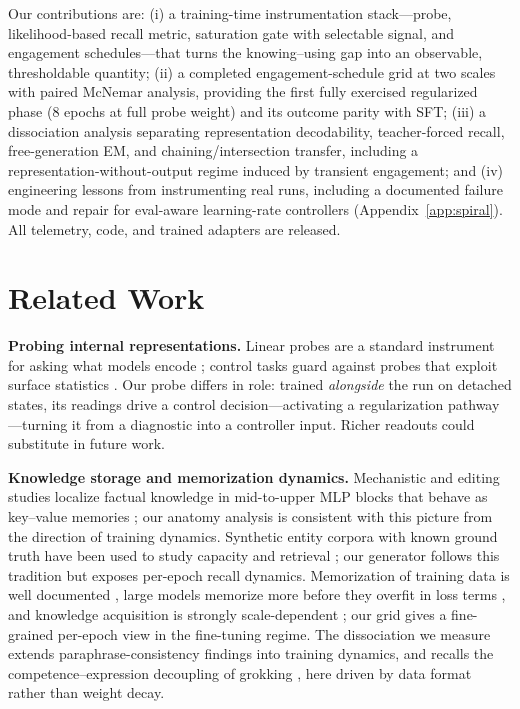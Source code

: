 Our contributions are: (i) a training-time instrumentation stack---probe,
likelihood-based recall metric, saturation gate with selectable signal,
and engagement schedules---that turns the knowing--using gap into an
observable, thresholdable quantity; (ii) a completed
engagement-schedule grid at two scales with paired McNemar analysis,
providing the first fully exercised regularized phase (8 epochs at
full probe weight) and its outcome parity with SFT; (iii) a
dissociation analysis separating representation decodability,
teacher-forced recall, free-generation EM, and chaining/intersection
transfer, including a representation-without-output regime induced by
transient engagement; and (iv) engineering lessons from instrumenting
real runs, including a documented failure mode and repair for
eval-aware learning-rate controllers (Appendix~\ref{app:spiral}).
All telemetry, code, and trained adapters are released.

\section{Related Work}
\label{sec:related}

\textbf{Probing internal representations.} Linear probes are a standard
instrument for asking what models encode
\citep{alain2017probes,belinkov2022probing}; control tasks guard against
probes that exploit surface statistics \citep{hewitt2019control}. Our
probe differs in role: trained \emph{alongside} the run on detached
states, its readings drive a control decision---activating a
regularization pathway---turning it from a diagnostic into a controller
input. Richer readouts \citep{bricken2023monosemanticity} could
substitute in future work.

\textbf{Knowledge storage and memorization dynamics.} Mechanistic and
editing studies localize factual knowledge in mid-to-upper MLP blocks
that behave as key--value memories
\citep{meng2022rome,meng2023memit,geva2021ffn,dai2022knowledgeneurons,
mitchell2022mend}; our anatomy analysis is consistent with this picture
from the direction of training dynamics. Synthetic entity corpora with
known ground truth have been used to study capacity and retrieval
\citep{allen2023physics}; our generator follows this tradition but
exposes per-epoch recall dynamics. Memorization of training data is
well documented \citep{carlini2023quantifying,zhang2017understanding},
large models memorize more before they overfit in loss terms
\citep{tirumala2022memorization}, and knowledge acquisition is strongly
scale-dependent \citep{kaplan2020scaling,kandpal2023large}; our grid
gives a fine-grained per-epoch view in the fine-tuning regime. The
dissociation we measure extends paraphrase-consistency findings
\citep{elazar2021measuring,mallen2023pararel} into training dynamics,
and recalls the competence--expression decoupling of grokking
\citep{power2022grokking}, here driven by data format rather than
weight decay.


